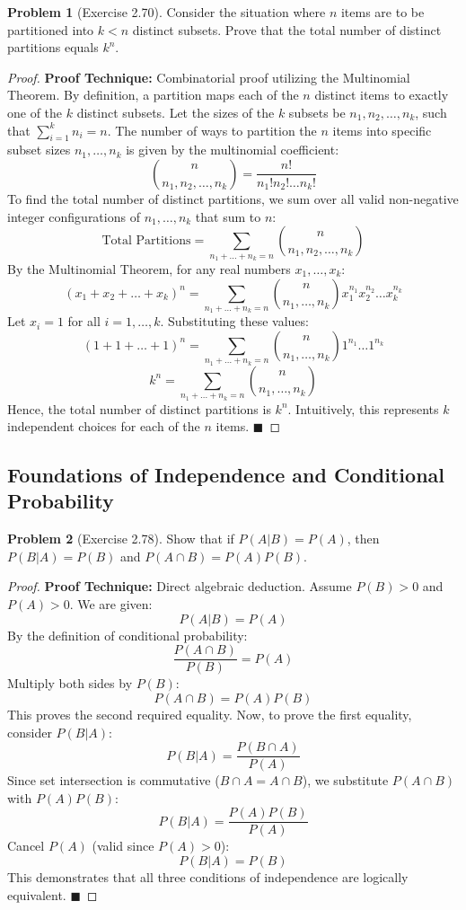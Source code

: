\documentclass[11pt, letterpaper]{article}
\theoremstyle{definition}
\newtheorem{problem}{Problem}
\begin{document}
\begin{problem}[Exercise 2.70]
Consider the situation where $n$ items are to be partitioned into $k < n$ distinct subsets. Prove that the total number of distinct partitions equals $k^n$.
\end{problem}
\begin{proof}
\textbf{Proof Technique:} Combinatorial proof utilizing the Multinomial Theorem.
By definition, a partition maps each of the $n$ distinct items to exactly one of the $k$ distinct subsets. Let the sizes of the $k$ subsets be $n_1, n_2, \dots, n_k$, such that $\sum_{i=1}^k n_i = n$.
The number of ways to partition the $n$ items into specific subset sizes $n_1, \dots, n_k$ is given by the multinomial coefficient:
\[ \binom{n}{n_1, n_2, \dots, n_k} = \frac{n!}{n_1! n_2! \dots n_k!} \]
To find the total number of distinct partitions, we sum over all valid non-negative integer configurations of $n_1, \dots, n_k$ that sum to $n$:
\[ \text{Total Partitions} = \sum_{n_1+\dots+n_k=n} \binom{n}{n_1, n_2, \dots, n_k} \]
By the Multinomial Theorem, for any real numbers $x_1, \dots, x_k$:
\[ (x_1 + x_2 + \dots + x_k)^n = \sum_{n_1+\dots+n_k=n} \binom{n}{n_1, \dots, n_k} x_1^{n_1} x_2^{n_2} \dots x_k^{n_k} \]
Let $x_i = 1$ for all $i = 1, \dots, k$. Substituting these values:
\[ (1 + 1 + \dots + 1)^n = \sum_{n_1+\dots+n_k=n} \binom{n}{n_1, \dots, n_k} 1^{n_1} \dots 1^{n_k} \]
\[ k^n = \sum_{n_1+\dots+n_k=n} \binom{n}{n_1, \dots, n_k} \]
Hence, the total number of distinct partitions is $k^n$. Intuitively, this represents $k$ independent choices for each of the $n$ items. $\blacksquare$
\end{proof}

\subsection{Foundations of Independence and Conditional Probability}

\begin{problem}[Exercise 2.78]
Show that if $P(A|B) = P(A)$, then $P(B|A) = P(B)$ and $P(A \cap B) = P(A)P(B)$.
\end{problem}
\begin{proof}
\textbf{Proof Technique:} Direct algebraic deduction.
Assume $P(B) > 0$ and $P(A) > 0$. We are given:
\[ P(A|B) = P(A) \]
By the definition of conditional probability:
\[ \frac{P(A \cap B)}{P(B)} = P(A) \]
Multiply both sides by $P(B)$:
\[ P(A \cap B) = P(A)P(B) \]
This proves the second required equality. Now, to prove the first equality, consider $P(B|A)$:
\[ P(B|A) = \frac{P(B \cap A)}{P(A)} \]
Since set intersection is commutative ($B \cap A = A \cap B$), we substitute $P(A \cap B)$ with $P(A)P(B)$:
\[ P(B|A) = \frac{P(A)P(B)}{P(A)} \]
Cancel $P(A)$ (valid since $P(A) > 0$):
\[ P(B|A) = P(B) \]
This demonstrates that all three conditions of independence are logically equivalent. $\blacksquare$
\end{proof}
\end{document}
